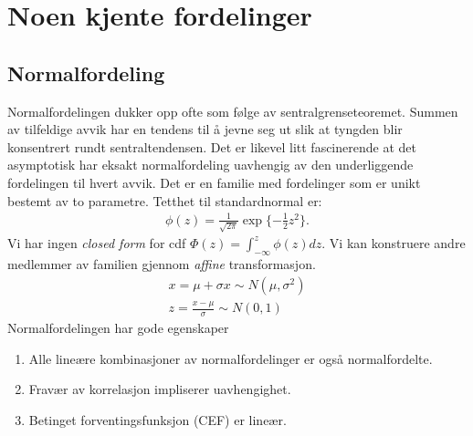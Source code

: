 \chapter{Noen kjente fordelinger}

\section{Normalfordeling}
Normalfordelingen dukker opp ofte som følge av sentralgrenseteoremet. Summen av tilfeldige avvik har en tendens til å jevne seg ut slik at tyngden blir konsentrert rundt sentraltendensen. Det er likevel litt fascinerende at det asymptotisk har eksakt normalfordeling uavhengig av den underliggende fordelingen til hvert avvik. Det er en familie med fordelinger som er unikt bestemt av to parametre. Tetthet til standardnormal er:
\begin{align}
\phi(z)=\frac{1}{\sqrt{2\pi}}\exp\{-\frac{1}{2}z^2\}.
\end{align}
Vi har ingen \textit{closed form} for cdf $\Phi(z) = \int_{-\infty}^z\phi(z)dz$. Vi kan konstruere andre medlemmer av familien gjennom \textit{affine} transformasjon.
\begin{align}
x = \mu + \sigma x \sim N(\mu, \sigma^2) \\
z = \frac{x-\mu}{\sigma} \sim N(0,1)
\end{align}
Normalfordelingen har gode egenskaper
\begin{enumerate}
\item Alle lineære kombinasjoner av normalfordelinger er også normalfordelte.
\item Fravær av korrelasjon impliserer uavhengighet. 
\item Betinget forventingsfunksjon (CEF) er lineær.
\end{enumerate}
